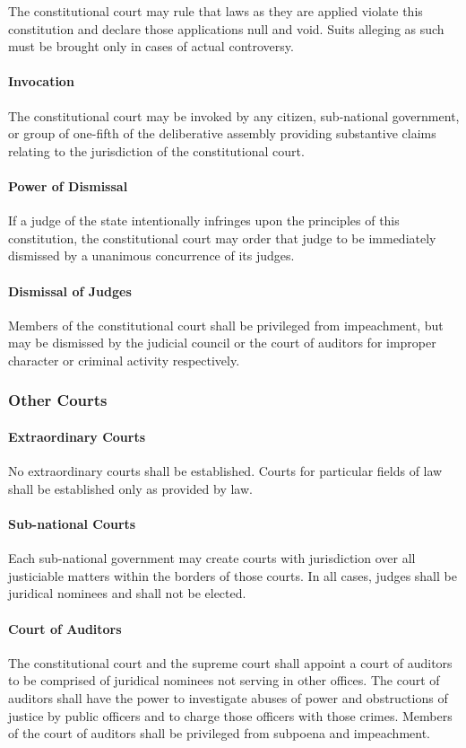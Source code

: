 \documentclass{article}
\begin{document}
The constitutional court may rule that laws as they are applied violate this constitution and declare those applications null and void. Suits alleging as such must be brought only in cases of actual controversy.
\paragraph{Invocation}
The constitutional court may be invoked by any citizen, sub-national government, or group of one-fifth of the deliberative assembly providing substantive claims relating to the jurisdiction of the constitutional court.
\paragraph{Power of Dismissal}
If a judge of the state intentionally infringes upon the principles of this constitution, the constitutional court may order that judge to be immediately dismissed by a unanimous concurrence of its judges.
\paragraph{Dismissal of Judges}
Members of the constitutional court shall be privileged from impeachment, but may be dismissed by the judicial council or the court of auditors for improper character or criminal activity respectively.
\subsubsection{Other Courts}
\paragraph{Extraordinary Courts}
No extraordinary courts shall be established. Courts for particular fields of law shall be established only as provided by law.
\paragraph{Sub-national Courts}
Each sub-national government may create courts with jurisdiction over all justiciable matters within the borders of those courts. In all cases, judges shall be juridical nominees and shall not be elected.
\paragraph{Court of Auditors}
The constitutional court and the supreme court shall appoint a court of auditors to be comprised of juridical nominees not serving in other offices. The court of auditors shall have the power to investigate abuses of power and obstructions of justice by public officers and to charge those officers with those crimes. Members of the court of auditors shall be privileged from subpoena and impeachment.
\end{document}
